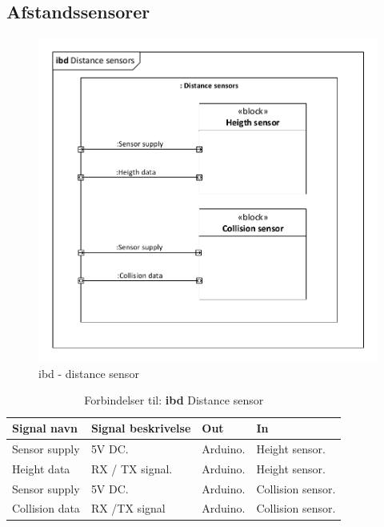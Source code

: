 \subsection{Afstandssensorer}

\begin{figure}[H]
\centering
\includegraphics[width=1\textwidth]{Billeder/IBD/ibd4_distancesensor.pdf}
\caption{ibd - distance sensor}
\label{fig:ibd_distancesensor}
\end{figure}

\begin{table}[H]
	\centering
		\begin{tabular}{|p{2.5 cm}|p{5.5 cm}|p{2.5 cm}|p{2.5 cm}|} 
		\hline
			\textbf{Signal navn} 	& \textbf{Signal beskrivelse}		& \textbf{Out} 				& \textbf{In}     \\ \hline
			Sensor supply & 5V DC.  & Arduino. & Height sensor.  \\ \hline
			Height data & RX / TX signal. & Arduino.	& Height sensor.	\\ \hline
			Sensor supply & 5V DC. & Arduino. & Collision sensor.	\\ \hline
			Collision data & RX /TX signal & Arduino. & Collision sensor.			    \\ \hline  
		\end{tabular}
	\caption{Forbindelser til: \textbf{ibd} Distance sensor}
	\label{tab:IBDDistancesensor}
\end{table}
